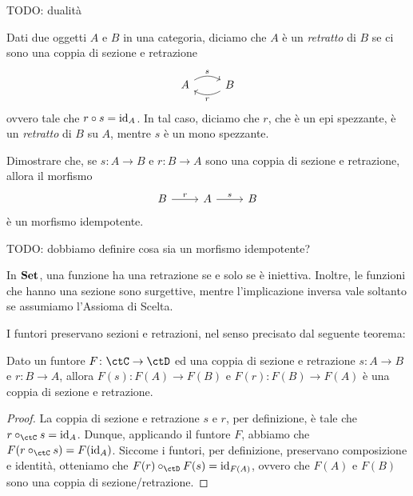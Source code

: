 TODO: dualità

\begin{definition}[Retratto]
	Dati due oggetti \(A\) e \(B\) in una categoria,
	diciamo che \(A\) è un \emph{retratto} di \(B\) se ci sono una coppia di sezione e retrazione
	\begin{equation}
		\begin{tikzcd}
			A \ar[r, bend left, "s"] &B \ar[l, bend left, "r"]
		\end{tikzcd}
	\end{equation}
	ovvero tale che \(r \circ s = \mathrm{id}_A\).
	In tal caso, diciamo che \(r\), che è un epi spezzante, è un \emph{retratto} di \(B\) su \(A\),
	mentre \(s\) è un mono spezzante.
\end{definition}

\begin{exercise}
	Dimostrare che, se \(s \colon A \to B\) e \(r \colon B \to A\) sono una coppia di sezione e retrazione,
	allora il morfismo
	\begin{equation}
		\begin{tikzcd}
			B \ar[r, "r"] & A \ar[r, "s"] &B
		\end{tikzcd}
	\end{equation}
	è un morfismo idempotente.

	TODO: dobbiamo definire cosa sia un morfismo idempotente?
\end{exercise}

\begin{example}
	\label{exm:set-sezioni-retrazioni}
	In \(\mathbf{Set}\), una funzione ha una retrazione se e solo se è iniettiva.
	Inoltre, le funzioni che hanno una sezione sono surgettive,
	mentre l'implicazione inversa vale soltanto se assumiamo l'Assioma di Scelta.
\end{example}

I funtori preservano sezioni e retrazioni,
nel senso precisato dal seguente teorema:

\begin{theorem}%
	\label{thm:fun-sezioni-retrazioni}
	Dato un funtore \(F \colon \ctC \to \ctD\) ed una coppia di sezione e retrazione \(s \colon A \to B\) e \(r \colon B \to A\),
	allora \(F(s) \colon F(A) \to F(B)\) e \(F(r) \colon F(B) \to F(A)\) è una coppia di sezione e retrazione.
\end{theorem}
\begin{proof}
	La coppia di sezione e retrazione \(s\) e \(r\),
	per definizione, è tale che \(r \cmp_{\ctC} s = \id_A\).
	Dunque, applicando il funtore \(F\), abbiamo che \(F(r \cmp_{\ctC} s) = F(\id_A)\).
	Siccome i funtori, per definizione, preservano composizione e identità,
	otteniamo che \(F(r) \cmp_{\ctD} F(s) = \id_{F(A)}\),
	ovvero che \(F(A)\) e \(F(B)\) sono una coppia di sezione/retrazione.
\end{proof}

